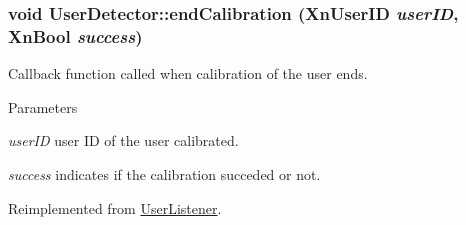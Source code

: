 \hypertarget{classUserDetector_a89a1b34569957c5cd4001c72561b554c}{
\subsubsection[{endCalibration}]{\setlength{\rightskip}{0pt plus 5cm}void UserDetector::endCalibration (XnUserID {\em userID}, \/  XnBool {\em success})}}
\label{classUserDetector_a89a1b34569957c5cd4001c72561b554c}
Callback function called when calibration of the user ends. 
\begin{DoxyParams}{Parameters}
\item[{\em userID}]user ID of the user calibrated. \item[{\em success}]indicates if the calibration succeded or not. \end{DoxyParams}


Reimplemented from \hyperlink{classUserListener_a76796b86efc4cc8fc1fc250149092c1e}{UserListener}.

